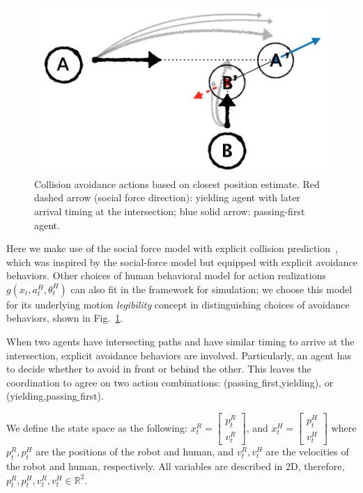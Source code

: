 \documentclass[letterpaper, 10 pt, conference]{ieeeconf}  %
\begin{document}
   \begin{figure}[t]
      \centering
      \vspace{-1em}
      \includegraphics[scale=0.27]{pedestrian_avoidance}
      \vspace{-1em}
      \caption{Collision avoidance actions based on closest position estimate. 
      Red dashed arrow (social force direction): yielding agent with later 
      arrival timing at the intersection; blue solid arrow: passing-first agent. }
      \vspace{-1.5em}
     \label{fig:legibility}
   \end{figure}
Here we make use of the social force model with explicit collision prediction~\cite{zanlungo2011social}, which was inspired by the 
social-force model but equipped with explicit avoidance behaviors. Other 
choices of human behavioral model for action realizations 
$g(x_t,a^H_t,\theta^H_t)$ can also fit in the framework for 
simulation; we choose this model for its underlying motion \textit{legibility} 
concept in distinguishing choices of avoidance behaviors, shown in Fig.~\ref{fig:legibility}.  

When two agents have intersecting paths and have similar timing to arrive 
at the intersection, explicit avoidance behaviors are involved. Particularly, 
an agent has to decide whether to avoid in front or behind the other. This 
leaves the coordination to agree on two action combinations: (passing$\_$first,yielding), 
or (yielding,passing$\_$first).

We define the state space as the following: $x_t^R = \begin{bmatrix}
p^R_t\\
v^R_t
\end{bmatrix}$, and $x_t^H = \begin{bmatrix}
p^H_t\\
v^H_t
\end{bmatrix}$
where $p^R_t, p^H_t$ are the positions of the robot and human, and 
$v^R_t,v^H_t$ are the velocities of the robot and human, respectively. All 
variables are described in 2D, therefore, $p^R_t,p^H_t,v^R_t,v^H_t \in \mathbb{R}^2$. 
\vspace{-.2em}
\end{document}
